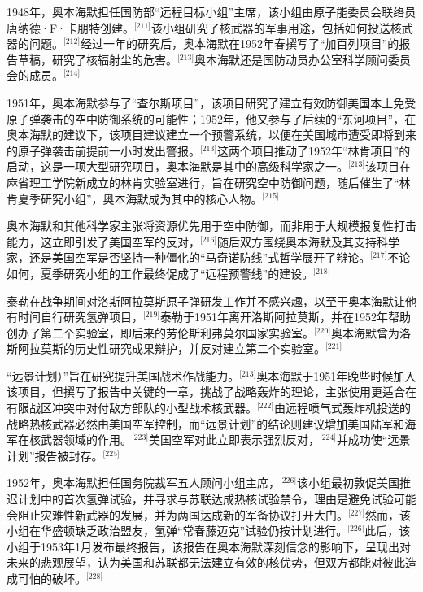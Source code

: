 1948年，奥本海默担任国防部“远程目标小组”主席，该小组由原子能委员会联络员唐纳德·F·卡朋特创建。\(^\text{[211]}\)该小组研究了核武器的军事用途，包括如何投送核武器的问题。\(^\text{[212]}\)经过一年的研究后，奥本海默在1952年春撰写了“加百列项目”的报告草稿，研究了核辐射尘的危害。\(^\text{[213]}\)奥本海默还是国防动员办公室科学顾问委员会的成员。\(^\text{[214]}\)

1951年，奥本海默参与了“查尔斯项目”，该项目研究了建立有效防御美国本土免受原子弹袭击的空中防御系统的可能性；1952年，他又参与了后续的“东河项目”，在奥本海默的建议下，该项目建议建立一个预警系统，以便在美国城市遭受即将到来的原子弹袭击前提前一小时发出警报。\(^\text{[213]}\)这两个项目推动了1952年“林肯项目”的启动，这是一项大型研究项目，奥本海默是其中的高级科学家之一。\(^\text{[213]}\)该项目在麻省理工学院新成立的林肯实验室进行，旨在研究空中防御问题，随后催生了“林肯夏季研究小组”，奥本海默成为其中的核心人物。\(^\text{[215]}\)

奥本海默和其他科学家主张将资源优先用于空中防御，而非用于大规模报复性打击能力，这立即引发了美国空军的反对，\(^\text{[216]}\)随后双方围绕奥本海默及其支持科学家，还是美国空军是否坚持一种僵化的“马奇诺防线”式哲学展开了辩论。\(^\text{[217]}\)不论如何，夏季研究小组的工作最终促成了“远程预警线”的建设。\(^\text{[218]}\)

泰勒在战争期间对洛斯阿拉莫斯原子弹研发工作并不感兴趣，以至于奥本海默让他有时间自行研究氢弹项目，\(^\text{[219]}\)泰勒于1951年离开洛斯阿拉莫斯，并在1952年帮助创办了第二个实验室，即后来的劳伦斯利弗莫尔国家实验室。\(^\text{[220]}\)奥本海默曾为洛斯阿拉莫斯的历史性研究成果辩护，并反对建立第二个实验室。\(^\text{[221]}\)

“远景计划）”旨在研究提升美国战术作战能力。\(^\text{[213]}\)奥本海默于1951年晚些时候加入该项目，但撰写了报告中关键的一章，挑战了战略轰炸的理论，主张使用更适合在有限战区冲突中对付敌方部队的小型战术核武器。\(^\text{[222]}\)由远程喷气式轰炸机投送的战略热核武器必然由美国空军控制，而“远景计划”的结论则建议增加美国陆军和海军在核武器领域的作用。\(^\text{[223]}\)美国空军对此立即表示强烈反对，\(^\text{[224]}\)并成功使“远景计划”报告被封存。\(^\text{[225]}\)

1952年，奥本海默担任国务院裁军五人顾问小组主席，\(^\text{[226]}\)该小组最初敦促美国推迟计划中的首次氢弹试验，并寻求与苏联达成热核试验禁令，理由是避免试验可能会阻止灾难性新武器的发展，并为两国达成新的军备协议打开大门。\(^\text{[227]}\)然而，该小组在华盛顿缺乏政治盟友，氢弹“常春藤迈克”试验仍按计划进行。\(^\text{[226]}\)此后，该小组于1953年1月发布最终报告，该报告在奥本海默深刻信念的影响下，呈现出对未来的悲观展望，认为美国和苏联都无法建立有效的核优势，但双方都能对彼此造成可怕的破坏。\(^\text{[228]}\)

